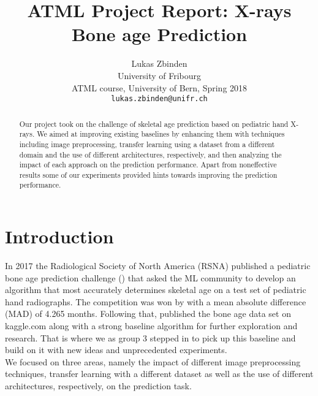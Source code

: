 \documentclass[10pt,twocolumn,letterpaper]{article}
\begin{document}
\title{ATML Project Report: X-rays Bone age Prediction}

\author{Lukas Zbinden\\
University of Fribourg\\
ATML course, University of Bern, Spring 2018\\
{\tt\small lukas.zbinden@unifr.ch}
}

\maketitle

\begin{abstract}
   Our project took on the challenge of skeletal age prediction based on pediatric hand X-rays. We aimed at improving existing baselines by enhancing them with techniques including image preprocessing, transfer learning using a dataset from a different domain and the use of different architectures, respectively, and then analyzing the impact of each approach on the prediction performance. Apart from noneffective results some of our experiments provided hints towards improving the prediction performance.
\end{abstract}

\section{Introduction}
In 2017 the Radiological Society of North America (RSNA) published a pediatric bone age prediction challenge (\cite{rsnacompetition}) that asked the ML community to develop an algorithm that most accurately determines skeletal age on a test set of pediatric hand radiographs. The competition was won by \cite{16bitrsnachallenge} with a mean absolute difference (MAD) of 4.265 months. Following that, \cite{kaggleboneage} published the bone age data set on kaggle.com along with a strong baseline algorithm for further exploration and research. That is where we as group 3 stepped in to pick up this baseline and build on it with new ideas and unprecedented experiments.\\ We focused on three areas, namely the impact of different image preprocessing techniques, transfer learning with a different dataset as well as the use of different architectures, respectively, on the prediction task.

\end{document}
